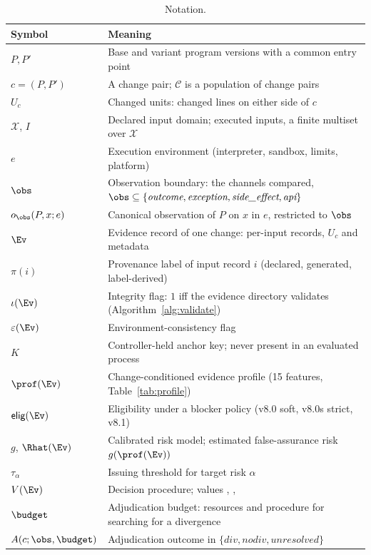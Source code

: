 \begin{table}[!t]
\caption{Notation.}
\label{tab:notation}
\centering
\scriptsize
\setlength{\tabcolsep}{3pt}
\begin{tabular}{|L{1.25cm}|L{6.1cm}|}
\hline
Symbol & Meaning \\
\hline
$P,P'$ & Base and variant program versions with a common entry point \\
$c=(P,P')$ & A change pair; $\mathcal{C}$ is a population of change pairs \\
$U_c$ & Changed units: changed lines on either side of $c$ \\
$\mathcal{X}$, $I$ & Declared input domain; executed inputs, a finite multiset over $\mathcal{X}$ \\
$e$ & Execution environment (interpreter, sandbox, limits, platform) \\
$\obs$ & Observation boundary: the channels compared, $\obs\subseteq\{\textit{outcome},\textit{exception},\textit{side\_effect},\textit{api}\}$ \\
$o_{\obs}(P,x;e)$ & Canonical observation of $P$ on $x$ in $e$, restricted to $\obs$ \\
$\Ev$ & Evidence record of one change: per-input records, $U_c$ and metadata \\
$\pi(i)$ & Provenance label of input record $i$ (declared, generated, label-derived) \\
$\iota(\Ev)$ & Integrity flag: $1$ iff the evidence directory validates (Algorithm~\ref{alg:validate}) \\
$\varepsilon(\Ev)$ & Environment-consistency flag \\
$K$ & Controller-held anchor key; never present in an evaluated process \\
$\prof(\Ev)$ & Change-conditioned evidence profile (15 features, Table~\ref{tab:profile}) \\
$\textsf{elig}(\Ev)$ & Eligibility under a blocker policy (v8.0 soft, v8.0s strict, v8.1) \\
$g$, $\Rhat(\Ev)$ & Calibrated risk model; estimated false-assurance risk $g(\prof(\Ev))$ \\
$\tau_\alpha$ & Issuing threshold for target risk $\alpha$ \\
$V(\Ev)$ & Decision procedure; values \DIV{}, \NDO{}, \INS{} \\
$\budget$ & Adjudication budget: resources and procedure for searching for a divergence \\
$A(c;\obs,\budget)$ & Adjudication outcome in $\{\textit{div},\textit{nodiv},\textit{unresolved}\}$ \\

\end{tabular}
\end{table}
